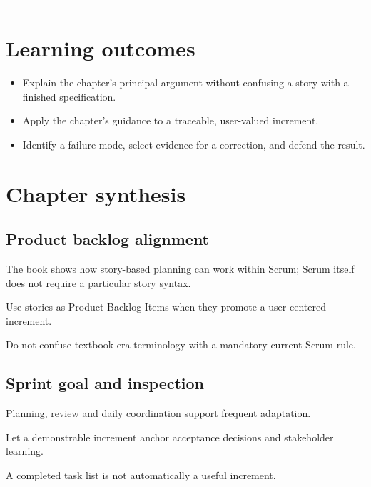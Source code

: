 \documentclass[11pt,letterpaper]{article}
\begin{document}
\tableofcontents\medskip\noindent\rule{\linewidth}{0.4pt}\medskip
\section{Learning outcomes}
\begin{itemize}[leftmargin=*,itemsep=2pt]
\item Explain the chapter's principal argument without confusing a story with a finished specification.
\item Apply the chapter's guidance to a traceable, user-valued increment.
\item Identify a failure mode, select evidence for a correction, and defend the result.
\end{itemize}
\section{Chapter synthesis}
\subsection{Product backlog alignment}
The book shows how story-based planning can work within Scrum; Scrum itself does not require a particular story syntax.

\begin{tcolorbox}[colback=tealback,colframe=navy,title={Engineering translation},breakable]
Use stories as Product Backlog Items when they promote a user-centered increment.

\end{tcolorbox}
\begin{tcolorbox}[colback=amberback,colframe=navy,title={Failure mode to watch},breakable]
Do not confuse textbook-era terminology with a mandatory current Scrum rule.

\end{tcolorbox}
\subsection{Sprint goal and inspection}
Planning, review and daily coordination support frequent adaptation.

\begin{tcolorbox}[colback=tealback,colframe=navy,title={Engineering translation},breakable]
Let a demonstrable increment anchor acceptance decisions and stakeholder learning.

\end{tcolorbox}
\begin{tcolorbox}[colback=amberback,colframe=navy,title={Failure mode to watch},breakable]
A completed task list is not automatically a useful increment.

\end{tcolorbox}
\end{document}
